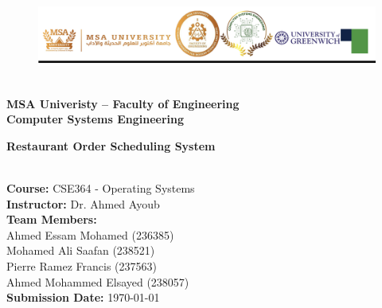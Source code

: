 \documentclass[a4paper,12pt]{article}
\begin{document}
\sloppy %

\begin{titlepage}
\centering
\vspace{1cm}
{
\begin{figure}
    \centering
    \includegraphics[width=1\linewidth]{logo.png}
    \label{fig:enter-label}
\end{figure}


 \textbf{\\[2cm]MSA Univeristy -- Faculty of Engineering \\[1cm]  Computer Systems Engineering \\[1cm]
 }

\LARGE \textbf{Restaurant Order Scheduling System}}\\[1.5cm]
\textbf{Course:} CSE364 - Operating Systems\\
\textbf{Instructor:} Dr. Ahmed Ayoub\\[1cm]
\textbf{Team Members:}\\
Ahmed Essam Mohamed (236385)\\
Mohamed Ali Saafan (238521)\\ 
Pierre Ramez Francis (237563)\\
Ahmed Mohammed Elsayed (238057)\\ [1cm]

\textbf{Submission Date:} \today\\[2cm]
\vfill
\end{titlepage}

\tableofcontents
\newpage

\end{document}
